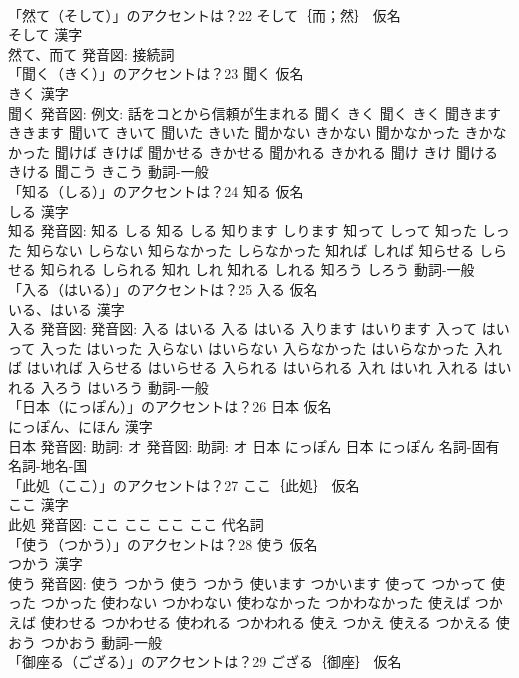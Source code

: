 \documentclass[8pt]{extreport}
\begin{document}
\begin{CJK}{UTF8}{min}
\\	「然て（そして）」のアクセントは？22	そして｛而；然｝ 仮名　
\\	そして 漢字　
\\	然て、而て 発音図:							接続詞 
\\	「聞く（きく）」のアクセントは？23	聞く 仮名　
\\	きく 漢字　
\\	聞く 発音図: 例文: 話をコとから信頼が生まれる	聞く きく		聞く きく 聞きます ききます 聞いて きいて 聞いた きいた 聞かない きかない 聞かなかった きかなかった 聞けば きけば 聞かせる きかせる 聞かれる きかれる 聞け きけ 聞ける きける 聞こう きこう				動詞-一般 
\\	「知る（しる）」のアクセントは？24	知る 仮名　
\\	しる 漢字　
\\	知る 発音図:	知る しる		知る しる 知ります しります 知って しって 知った しった 知らない しらない 知らなかった しらなかった 知れば しれば 知らせる しらせる 知られる しられる 知れ しれ 知れる しれる 知ろう しろう				動詞-一般 
\\	「入る（はいる）」のアクセントは？25	入る 仮名　
\\	いる、はいる 漢字　
\\	入る 発音図: 発音図:	入る はいる		入る はいる 入ります はいります 入って はいって 入った はいった 入らない はいらない 入らなかった はいらなかった 入れば はいれば 入らせる はいらせる 入られる はいられる 入れ はいれ 入れる はいれる 入ろう はいろう				動詞-一般 
\\	「日本（にっぽん）」のアクセントは？26	日本 仮名　
\\	にっぽん、にほん 漢字　
\\	日本 発音図: 助詞: オ 発音図: 助詞: オ	日本 にっぽん		日本 にっぽん				名詞-固有名詞-地名-国 
\\	「此処（ここ）」のアクセントは？27	ここ｛此処｝ 仮名　
\\	ここ 漢字　
\\	此処 発音図:	ここ ここ		ここ ここ				代名詞 
\\	「使う（つかう）」のアクセントは？28	使う 仮名　
\\	つかう 漢字　
\\	使う 発音図:	使う つかう		使う つかう 使います つかいます 使って つかって 使った つかった 使わない つかわない 使わなかった つかわなかった 使えば つかえば 使わせる つかわせる 使われる つかわれる 使え つかえ 使える つかえる 使おう つかおう				動詞-一般 
\\	「御座る（ござる）」のアクセントは？29	ござる｛御座｝ 仮名　

\end{CJK}
\end{document}
